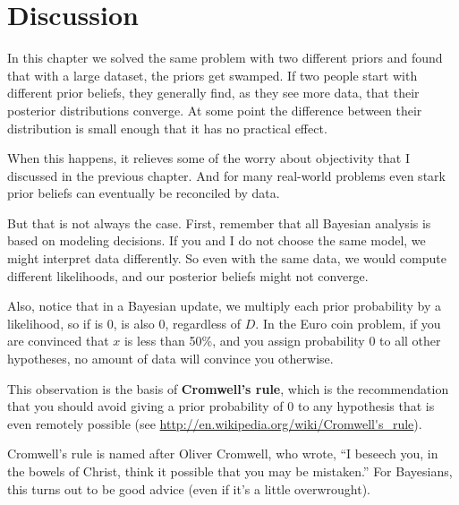 \documentclass[12pt]{book}
\begin{document}


\section{Discussion}

In this chapter we solved the same problem with two different 
priors and found that with a large dataset, the priors get
swamped.  If two people start with different
prior beliefs, they generally find, as they see more data, that
their posterior distributions converge.  At some point the
difference between their distribution is small enough that it has
no practical effect.

When this happens, it relieves some of the worry about objectivity
that I discussed in the previous chapter.  And for many real-world
problems even stark prior beliefs can eventually be reconciled
by data.

But that is not always the case.  First, remember that all Bayesian
analysis is based on modeling decisions.  If you and I do not
choose the same model, we might interpret data differently.  So
even with the same data, we would compute different likelihoods,
and our posterior beliefs might not converge.

Also, notice that in a Bayesian update, we multiply
each prior probability by a likelihood, so if  is 0,
 is also 0, regardless of $D$.  In the Euro coin problem,
if you are convinced that $x$ is less than 50\%, and you assign
probability 0 to all other hypotheses, no amount of data will
convince you otherwise.

This observation is the basis of {\bf Cromwell's rule}, which is the
recommendation that you should avoid giving a prior probability of
0 to any hypothesis that is even remotely possible
(see \url{http://en.wikipedia.org/wiki/Cromwell's_rule}).

Cromwell's rule is named after Oliver Cromwell, who wrote, ``I beseech
you, in the bowels of Christ, think it possible that you may be
mistaken.''  For Bayesians, this turns out to be good advice (even if
it's a little overwrought).
\end{document}
